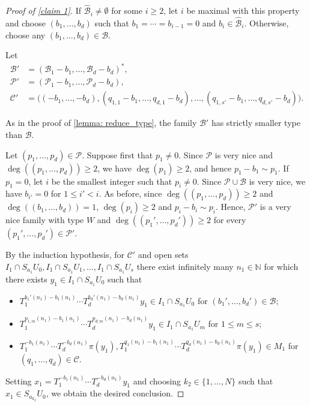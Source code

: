 \documentclass[10pt,a4paper]{amsart}
\newcommand{\N}{\mathbb{N}}
\newcommand{\cB}{{\mathcal B}}
\newcommand{\cC}{{\mathcal C}}
\newcommand{\cP}{{\mathcal P}}
\begin{document}
\begin{proof}[Proof of \cref{claim 1}]
     If $\widehat{\cB}_i\neq\emptyset$ for some $i\geq 2$, let $i$ be maximal with this property and choose $(b_1,\dots,b_d)$ such that $b_1=\cdots=b_{i-1}=0$ and $b_i\in \widehat{\cB}_i$. Otherwise, choose any $(b_1,\dots,b_d)\in \cB$.
        
    Let \begin{align*}
        \cB' &= (\cB_1 -b_1,\dots,\cB_d-b_d)^*,\\
        \cP' &= (\cP_1 - b_1,\dots,\cP_d-b_d),\\
        \cC' &= \big((-b_1,\dots,-b_d),(q_{1,1}-b_1,\dots,q_{d,1}-b_d),\dots, (q_{1,s'}-b_1,\dots,q_{d,s'}-b_d)\big ).
    \end{align*}

    As in the proof of \cref{lemma: reduce_type}, the family $\cB'$ has strictly smaller type than $\cB$. 
    
    Let $(p_1,\dots,p_d)\in \cP$. Suppose first that $p_1\neq 0$. Since $\cP$ is very nice and $\deg((p_1,\dots,p_d))\geq 2$, we have $\deg(p_1)\geq 2$, and hence $p_1-b_1\sim p_1$. If $p_1=0$, let $i$ be the smallest integer such that $p_i\neq 0$. Since $\cP\cup\cB$ is very nice, we have $b_{i'}=0$ for $1\leq i'< i$. As before, since $\deg((p_1,\dots,p_d))\geq 2$ and $\deg((b_1,\dots,b_d))= 1$, $\deg(p_i)\geq 2$ and $p_i-b_i\sim p_i$. Hence, $\cP'$ is a very nice family with type $W$ and $\deg((p_1',\dots,p_d'))\geq 2$ for every $(p_1',\dots,p_d')\in \cP'$. 

    By the induction hypothesis, for $\cC'$ and open sets $I_1\cap S_{a_1}U_0, I_1\cap S_{a_1}U_1,\dots,I_1\cap S_{a_1}U_s$ there exist infinitely many $n_1\in \N$ for which there exists $y_1 \in I_{1}\cap S_{a_1}U_0$ such that\begin{itemize}
        \item $T_1^{b_1'(n_1)-b_1(n_1)}\cdots T_d^{b_d'(n_1)-b_d(n_1)}y_1\in I_1\cap S_{a_1}U_0$ for $(b_1',\dots,b_d')\in \cB$;
        \item $T_1^{p_{1,m}(n_1)-b_1(n_1)}\cdots T_d^{p_{d,m}(n_1)-b_d(n_1)}y_1\in I_1\cap S_{a_1}U_m$ for $1\leq m \leq s$;
        \item $T_1^{-b_1(n_1)}\cdots T_d^{-b_d(n_1)}\pi(y_1), T_1^{q_1(n_1)-b_1(n_1)}\cdots T_d^{q_d(n_1)-b_d(n_1)}\pi(y_1)\in M_1$ for $(q_1,\dots,q_d)\in \cC$.
    \end{itemize}

    Setting $x_1 = T_1^{-b_1(n_1)}\cdots T_d^{-b_d(n_1)}y_1$ and choosing $k_2\in \{1,\dots,N\}$ such that $x_1\in S_{a_{k_2}}U_0$, we obtain the desired conclusion.


\end{proof}
\end{document}
